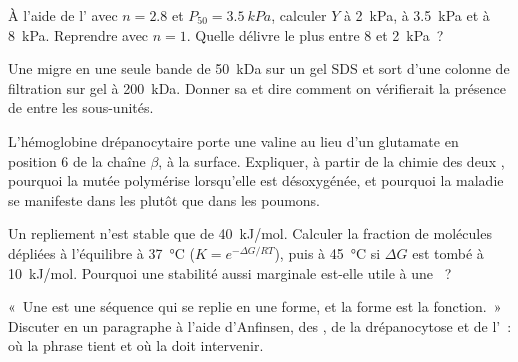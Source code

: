 \begin{exercise}[$\star\star$]\label{exo:b1:proteins:8}
À l'aide de l' avec $n = 2.8$ et
$P_{50} = \qty{3.5}{kPa}$, calculer $Y$ à \qty{2}{kPa}, à
\qty{3.5}{kPa} et à \qty{8}{kPa}. Reprendre avec $n = 1$. Quelle
 délivre le plus entre \qty{8}{} et \qty{2}{kPa}~?
\end{exercise}

\begin{exercise}[$\star\star$]\label{exo:b1:proteins:9}
Une  migre en une seule bande de \qty{50}{kDa} sur un gel SDS et
sort d'une colonne de filtration sur gel à \qty{200}{kDa}. Donner sa
 et dire comment on vérifierait la présence de
 entre les sous-unités.
\end{exercise}

\begin{exercise}[$\star\star\star$]\label{exo:b1:proteins:10}
L'hémoglobine drépanocytaire porte une valine au lieu d'un glutamate en
position 6 de la chaîne $\beta$, à la surface. Expliquer, à partir de la
chimie des deux , pourquoi la  mutée
polymérise lorsqu'elle est désoxygénée, et pourquoi la maladie se
manifeste dans les  plutôt que dans les poumons.
\end{exercise}

\begin{exercise}[$\star\star\star$]\label{exo:b1:proteins:11}
Un repliement n'est stable que de \qty{40}{kJ/mol}. Calculer la fraction
de molécules dépliées à l'équilibre à \qty{37}{\celsius}
($K = e^{-\Delta G/RT}$), puis à \qty{45}{\celsius} si $\Delta G$ est
tombé à \qty{10}{kJ/mol}. Pourquoi une stabilité aussi marginale est-elle
utile à une ~?
\end{exercise}

\begin{exercise}[$\star\star\star$]\label{exo:b1:proteins:12}
«~Une  est une séquence qui se replie en une forme, et la forme
est la fonction.~» Discuter en un paragraphe à l'aide d'Anfinsen, des
, de la drépanocytose et de l'~: où la phrase tient
et où la  doit intervenir.
\end{exercise}

